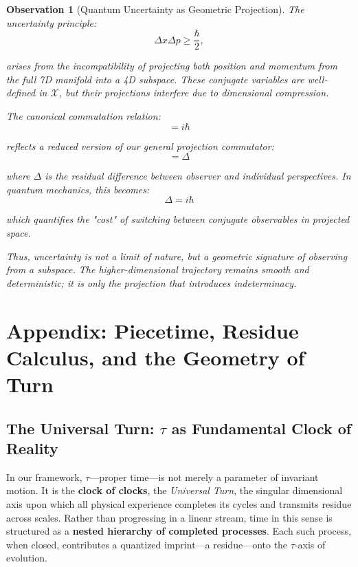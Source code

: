 \documentclass{article}
\newtheorem{observation}{Observation}
\begin{document}
\begin{observation}[Quantum Uncertainty as Geometric Projection]
The uncertainty principle:
\begin{equation}
\Delta x \Delta p \geq \frac{\hbar}{2},
\end{equation}

arises from the incompatibility of projecting both position and momentum from the full 7D manifold into a 4D subspace. These conjugate variables are well-defined in \( \mathcal{X} \), but their projections interfere due to dimensional compression.

The canonical commutation relation:
\begin{equation}
[x, p] = i\hbar
\end{equation}

reflects a reduced version of our general projection commutator:
\begin{equation}
[O, I] = \Delta
\end{equation}

where \( \Delta \) is the residual difference between observer and individual perspectives. In quantum mechanics, this becomes:
\begin{equation}
\Delta = i\hbar
\end{equation}

which quantifies the "cost" of switching between conjugate observables in projected space.

Thus, uncertainty is not a limit of nature, but a geometric signature of observing from a subspace. The higher-dimensional trajectory remains smooth and deterministic; it is only the projection that introduces indeterminacy.
\end{observation}





\section{Appendix: Piecetime, Residue Calculus, and the Geometry of Turn}

\subsection*{The Universal Turn: \( \tau \) as Fundamental Clock of Reality}
In our framework, \( \tau \)---proper time---is not merely a parameter of invariant motion. It is the \textbf{clock of clocks}, the \textit{Universal Turn}, the singular dimensional axis upon which all physical experience completes its cycles and transmits residue across scales. Rather than progressing in a linear stream, time in this sense is structured as a \textbf{nested hierarchy of completed processes}. Each such process, when closed, contributes a quantized imprint---a residue---onto the \( \tau \)-axis of evolution.
\end{document}
